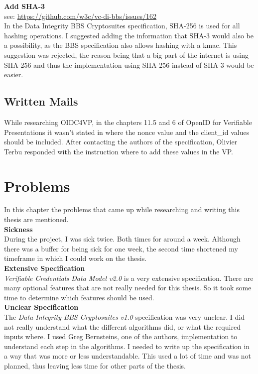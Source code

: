 \documentclass[
	a4paper               %
	,BCOR=0mm            %
	,bibliography=totoc   %
	,listof=totoc         %
	,monolingual
	,twoside=false
]{bfhthesis}              %
\begin{document}
\noindent
\textbf{Add SHA-3}\\
see: \url{https://github.com/w3c/vc-di-bbs/issues/162}\\
In the Data Integrity BBS Cryptosuites\cite{bbsvc} specification, SHA-256 is used for all hashing operations. I suggested adding the information that SHA-3 would also be a possibility, as the BBS specification also allows hashing with a kmac. This suggestion was rejected, the reason being that a big part of the internet is using SHA-256 and thus the implementation using SHA-256 instead of SHA-3 would be easier.


\section{Written Mails}
While researching OIDC4VP, in the chapters 11.5 and 6 of OpenID for Verifiable Presentations \cite{oidc4vp} it wasn't stated in where the nonce value and the client\_id values should be included. After contacting the authors of the specification, Olivier Terbu responded with the instruction where to add these values in the VP.


\chapter{Problems}
In this chapter the problems that came up while researching and writing this thesis are mentioned.\\

\noindent
\textbf{Sickness}\\
During the project, I was sick twice. Both times for around a week. Although there was a buffer for being sick for one week, the second time shortened my timeframe in which I could work on the thesis.\\

\noindent
\textbf{Extensive Specification}\\
\textit{Verifiable Credentials Data Model v2.0}\cite{verifiable-credentials} is a very extensive specification. There are many optional features that are not really needed for this thesis. So it took some time to determine which features should be used.\\

\noindent
\textbf{Unclear Specification}\\
The \textit{Data Integrity BBS Cryptosuites v1.0}\cite{bbsvc} specification was very unclear. I did not really understand what the different algorithms did, or what the required inputs where. I used Greg Bernsteins, one of the authors, implementation to understand each step in the algorithms. I needed to write up the specification in a way that was more or less understandable. This used a lot of time and was not planned, thus leaving less time for other parts of the thesis.\\
\end{document}
